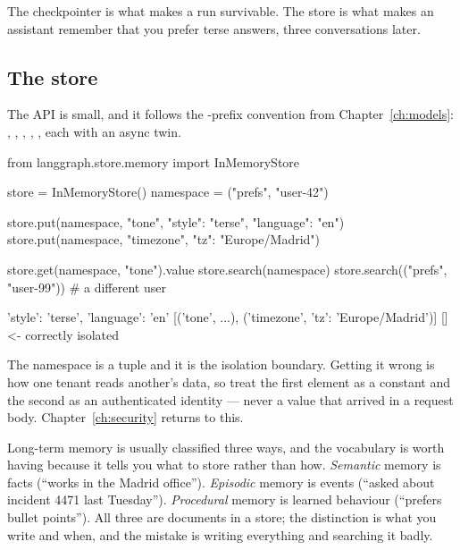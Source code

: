 The checkpointer is what makes a run survivable. The store is what makes an
assistant remember that you prefer terse answers, three conversations later.

\subsection{The store}
\label{sec:store}

The API is small, and it follows the -prefix convention from
Chapter~\ref{ch:models}: , , , ,
, each with an async twin.

\begin{python}[caption={Namespaced long-term memory}, label={lst:store}]
from langgraph.store.memory import InMemoryStore

store = InMemoryStore()
namespace = ("prefs", "user-42")

store.put(namespace, "tone", {"style": "terse", "language": "en"})
store.put(namespace, "timezone", {"tz": "Europe/Madrid"})

store.get(namespace, "tone").value
store.search(namespace)
store.search(("prefs", "user-99"))          # a different user
\end{python}

\begin{console}
{'style': 'terse', 'language': 'en'}
[('tone', {...}), ('timezone', {'tz': 'Europe/Madrid'})]
[]                                          <- correctly isolated
\end{console}

The namespace is a tuple and it is the isolation boundary. Getting it wrong is
how one tenant reads another's data, so treat the first element as a constant and
the second as an authenticated identity --- never a value that arrived in a
request body. Chapter~\ref{ch:security} returns to this.

\begin{note}
Long-term memory is usually classified three ways, and the vocabulary is worth
having because it tells you what to store rather than how.
\emph{Semantic} memory is facts (``works in the Madrid office'').
\emph{Episodic} memory is events (``asked about incident 4471 last Tuesday'').
\emph{Procedural} memory is learned behaviour (``prefers bullet points'').
All three are documents in a store; the distinction is what you write and when,
and the mistake is writing everything and searching it badly.
\end{note}

